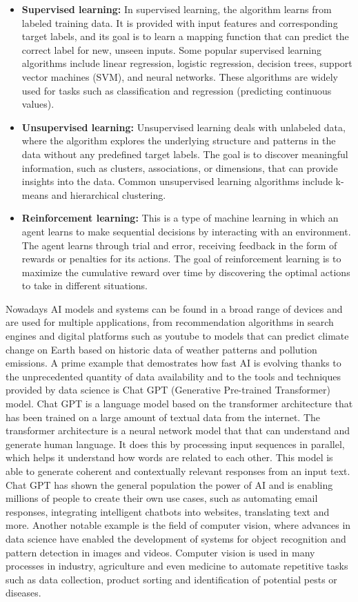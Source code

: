 \documentclass{vgtc}                          %
\begin{document}
\begin{itemize}
  \item \textbf{Supervised learning:} In supervised learning, the algorithm learns from labeled training data. It is provided with input features and corresponding target labels, and its goal is to 
  learn a mapping function that can predict the correct label for new, unseen inputs. Some popular supervised learning algorithms include linear regression, logistic regression, decision trees, 
  support vector machines (SVM), and neural networks. These algorithms are widely used for tasks such as classification and regression (predicting continuous values).
  \item \textbf{Unsupervised learning:} Unsupervised learning deals with unlabeled data, where the algorithm explores the underlying structure and patterns in the data without any predefined 
  target labels. The goal is to discover meaningful information, such as clusters, associations, or dimensions, that can provide insights into the data. Common unsupervised learning algorithms 
  include k-means and hierarchical clustering.
  \item \textbf{Reinforcement learning:} This is a type of machine learning in which an agent learns to make sequential decisions by interacting with an environment. The agent learns through 
  trial and error, receiving feedback in the form of rewards or penalties for its actions. The goal of reinforcement learning is to maximize the cumulative reward over time by discovering the 
  optimal actions to take in different situations.
\end{itemize} 

Nowadays AI models and systems can be found in a broad range of devices and are used for multiple applications, from recommendation algorithms in search engines and digital platforms such as youtube to 
models that can predict climate change on Earth based on historic data of weather patterns and pollution emissions. A prime example that demostrates how fast AI is evolving 
thanks to the unprecedented quantity of data availability and to the tools and techniques provided by data science is Chat GPT (Generative Pre-trained Transformer) model. Chat GPT is a language model 
based on the transformer architecture that has been trained on a large amount of textual data from the internet. The transformer architecture is a neural network model that that can understand and 
generate human language. It does this by processing input sequences in parallel, which helps it understand how words are related to each other. This model is able to generate coherent and contextually 
relevant responses from an input text. Chat GPT has shown the general population the power of AI and is enabling millions of people to create their own use cases, such as automating email responses, 
integrating intelligent chatbots into websites, translating text and more. Another notable example is the field of computer vision, where advances in data science have enabled the 
development of systems for object recognition and pattern detection in images and videos. Computer vision is used in many processes in industry, agriculture and even medicine to automate repetitive tasks 
such as data collection, product sorting and identification of potential pests or diseases.
\end{document}
